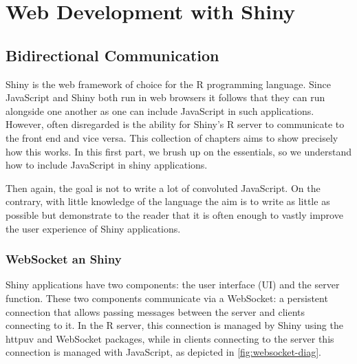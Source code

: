 \documentclass[10pt,]{krantz}
\begin{document}
\hypertarget{part-web-development-with-shiny}{%
\part{Web Development with Shiny}\label{part-web-development-with-shiny}}

\hypertarget{shiny-intro}{%
\chapter{Bidirectional Communication}\label{shiny-intro}}

Shiny is the web framework of choice for the R programming language. Since JavaScript and Shiny both run in web browsers it follows that they can run alongside one another as one can include JavaScript in such applications. However, often disregarded is the ability for Shiny's R server to communicate to the front end and vice versa. This collection of chapters aims to show precisely how this works. In this first part, we brush up on the essentials, so we understand how to include JavaScript in shiny applications.

Then again, the goal is not to write a lot of convoluted JavaScript. On the contrary, with little knowledge of the language the aim is to write as little as possible but demonstrate to the reader that it is often enough to vastly improve the user experience of Shiny applications.

\hypertarget{shiny-intro-websocket}{%
\section{WebSocket an Shiny}\label{shiny-intro-websocket}}

Shiny applications have two components: the user interface (UI) and the server function. These two components communicate via a WebSocket: a persistent connection that allows passing messages between the server and clients connecting to it. In the R server, this connection is managed by Shiny using the httpuv \citep{R-httpuv} and WebSocket \citep{R-websocket} packages, while in clients connecting to the server this connection is managed with JavaScript, as depicted in \ref{fig:websocket-diag}.
\end{document}
